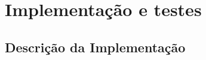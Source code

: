 \chapter{Implementação e testes}
\label{cha:imp}
















\section{Descrição da Implementação}

